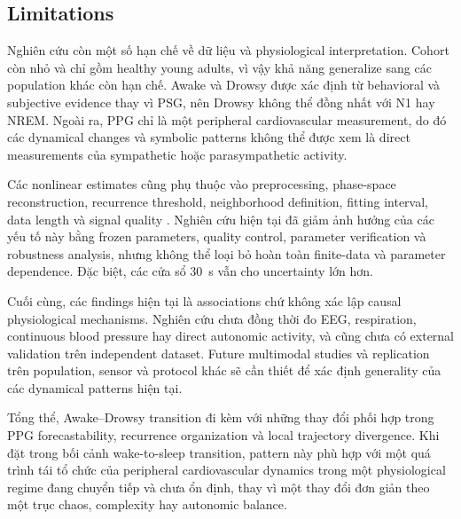\subsection{Limitations}

Nghiên cứu còn một số hạn chế về dữ liệu và physiological interpretation. Cohort còn nhỏ và chỉ gồm healthy young adults, vì vậy khả năng generalize sang các population khác còn hạn chế. Awake và Drowsy được xác định từ behavioral và subjective evidence thay vì PSG, nên Drowsy không thể đồng nhất với N1 hay NREM. Ngoài ra, PPG chỉ là một peripheral cardiovascular measurement, do đó các dynamical changes và symbolic patterns không thể được xem là direct measurements của sympathetic hoặc parasympathetic activity.

Các nonlinear estimates cũng phụ thuộc vào preprocessing, phase-space reconstruction, recurrence threshold, neighborhood definition, fitting interval, data length và signal quality \cite{martingonzalez2018,sviridova2022,yeragani2004,hu2009}. Nghiên cứu hiện tại đã giảm ảnh hưởng của các yếu tố này bằng frozen parameters, quality control, parameter verification và robustness analysis, nhưng không thể loại bỏ hoàn toàn finite-data và parameter dependence. Đặc biệt, các cửa sổ 30~s vẫn cho uncertainty lớn hơn.

Cuối cùng, các findings hiện tại là associations chứ không xác lập causal physiological mechanisms. Nghiên cứu chưa đồng thời đo EEG, respiration, continuous blood pressure hay direct autonomic activity, và cũng chưa có external validation trên independent dataset. Future multimodal studies và replication trên population, sensor và protocol khác sẽ cần thiết để xác định generality của các dynamical patterns hiện tại.

Tổng thể, Awake--Drowsy transition đi kèm với những thay đổi phối hợp trong PPG forecastability, recurrence organization và local trajectory divergence. Khi đặt trong bối cảnh wake-to-sleep transition, pattern này phù hợp với một quá trình tái tổ chức của peripheral cardiovascular dynamics trong một physiological regime đang chuyển tiếp và chưa ổn định, thay vì một thay đổi đơn giản theo một trục chaos, complexity hay autonomic balance.
